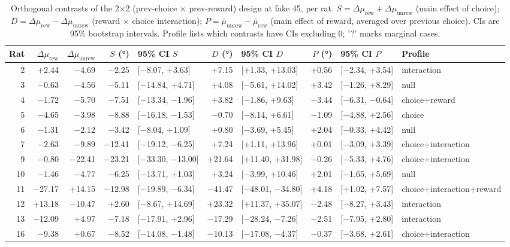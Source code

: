 \begin{table}[htbp]
  \centering
  \caption{Orthogonal contrasts of the 2$\times$2 (prev-choice $\times$ prev-reward) design at fake 45\textdegree, per rat. $S = \Delta\mu_{\mathrm{rew}} + \Delta\mu_{\mathrm{unrew}}$ (main effect of choice); $D = \Delta\mu_{\mathrm{rew}} - \Delta\mu_{\mathrm{unrew}}$ (reward $\times$ choice interaction); $P = \bar\mu_{\mathrm{unrew}} - \bar\mu_{\mathrm{rew}}$ (main effect of reward, averaged over previous choice). CIs are 95\% bootstrap intervals. Profile lists which contrasts have CIs excluding 0; '?' marks marginal cases.}
  \label{tab:orthogonal_contrasts}
  \begin{tabular}{rrrrlrlrll}
    \toprule
    Rat & $\Delta\mu_{\mathrm{rew}}$ & $\Delta\mu_{\mathrm{unrew}}$ & $S$ (°) & 95\% CI $S$ & $D$ (°) & 95\% CI $D$ & $P$ (°) & 95\% CI $P$ & Profile \\
    \midrule
    2 & +2.44 & −4.69 & −2.25 & [−8.07, +3.63] & +7.15 & [+1.33, +13.03] & +0.56 & [−2.34, +3.54] & interaction \\
    3 & −0.63 & −4.56 & −5.11 & [−14.84, +4.71] & +4.08 & [−5.61, +14.02] & +3.42 & [−1.26, +8.29] & null \\
    4 & −1.72 & −5.70 & −7.51 & [−13.34, −1.96] & +3.82 & [−1.86, +9.63] & −3.44 & [−6.31, −0.64] & choice+reward \\
    5 & −4.65 & −3.98 & −8.88 & [−16.18, −1.53] & −0.70 & [−8.14, +6.61] & −1.09 & [−4.88, +2.56] & choice \\
    6 & −1.31 & −2.12 & −3.42 & [−8.04, +1.09] & +0.80 & [−3.69, +5.45] & +2.04 & [−0.33, +4.42] & null \\
    7 & −2.63 & −9.89 & −12.41 & [−19.12, −6.25] & +7.24 & [+1.11, +13.96] & +0.01 & [−3.09, +3.39] & choice+interaction \\
    9 & −0.80 & −22.41 & −23.21 & [−33.30, −13.00] & +21.64 & [+11.40, +31.98] & −0.26 & [−5.33, +4.76] & choice+interaction \\
    10 & −1.46 & −4.77 & −6.25 & [−13.71, +1.03] & +3.24 & [−3.99, +10.46] & +2.01 & [−1.65, +5.69] & null \\
    11 & −27.17 & +14.15 & −12.98 & [−19.89, −6.34] & −41.47 & [−48.01, −34.80] & +4.18 & [+1.02, +7.57] & choice+interaction+reward \\
    12 & +13.18 & −10.47 & +2.60 & [−8.67, +14.69] & +23.32 & [+11.37, +35.07] & −2.48 & [−8.27, +3.43] & interaction \\
    13 & −12.09 & +4.97 & −7.18 & [−17.91, +2.96] & −17.29 & [−28.24, −7.26] & −2.51 & [−7.95, +2.80] & interaction \\
    16 & −9.38 & +0.67 & −8.52 & [−14.08, −1.48] & −10.13 & [−17.08, −4.37] & −0.37 & [−3.68, +2.61] & choice+interaction \\
    \bottomrule
  \end{tabular}
\end{table}
